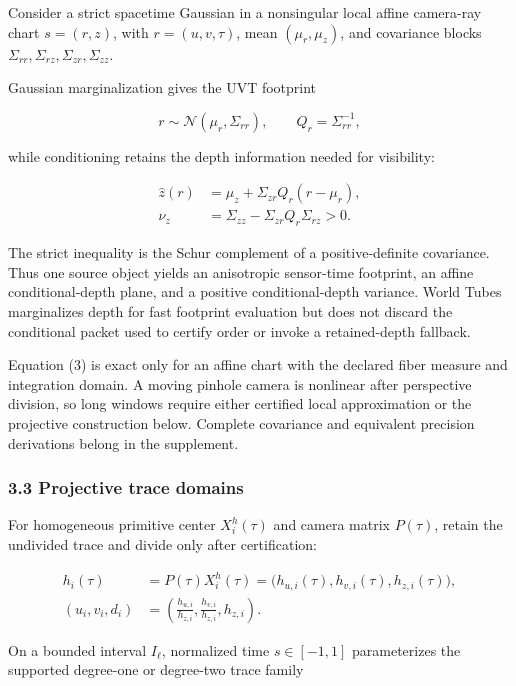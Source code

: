 \documentclass[
]{article}
\begin{document}
Consider a strict spacetime Gaussian in a nonsingular local affine
camera-ray chart \(s=(r,z)\), with \(r=(u,v,\tau)\), mean
\((\mu_r,\mu_z)\), and covariance blocks
\(\Sigma_{rr},\Sigma_{rz},\Sigma_{zr},\Sigma_{zz}\).

Gaussian marginalization gives the UVT footprint

\[
  r\sim\mathcal N(\mu_r,\Sigma_{rr}),
  \qquad Q_r=\Sigma_{rr}^{-1},
  \tag{3}
\]

while conditioning retains the depth information needed for visibility:

\[
\begin{aligned}
  \widehat z(r)
    &=\mu_z+\Sigma_{zr}Q_r(r-\mu_r),\\
  \nu_z
    &=\Sigma_{zz}-\Sigma_{zr}Q_r\Sigma_{rz}>0.
\end{aligned}
\tag{4}
\]

The strict inequality is the Schur complement of a positive-definite
covariance. Thus one source object yields an anisotropic sensor-time
footprint, an affine conditional-depth plane, and a positive
conditional-depth variance. World Tubes marginalizes depth for fast
footprint evaluation but does not discard the conditional packet used to
certify order or invoke a retained-depth fallback.

Equation (3) is exact only for an affine chart with the declared fiber
measure and integration domain. A moving pinhole camera is nonlinear
after perspective division, so long windows require either certified
local approximation or the projective construction below. Complete
covariance and equivalent precision derivations belong in the
supplement.

\subsubsection{3.3 Projective trace
domains}\label{projective-trace-domains}

For homogeneous primitive center \(X_i^h(\tau)\) and camera matrix
\(P(\tau)\), retain the undivided trace and divide only after
certification:

\[
\begin{aligned}
  h_i(\tau)&=P(\tau)X_i^h(\tau)
  =\bigl(h_{u,i}(\tau),h_{v,i}(\tau),h_{z,i}(\tau)\bigr),\\
  (u_i,v_i,d_i)&=\left(\frac{h_{u,i}}{h_{z,i}},
          \frac{h_{v,i}}{h_{z,i}},h_{z,i}\right).
\end{aligned}
  \tag{5}
\]

On a bounded interval \(I_\ell\), normalized time \(s\in[-1,1]\)
parameterizes the supported degree-one or degree-two trace family
\end{document}
